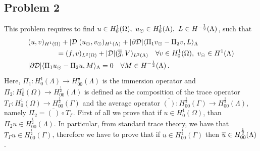 \subsection{Problem 2}
This problem requires to find $u \in H^1_0(\Omega),\ u_{\odot} \in H^1_0(\Lambda), \ L \in H^{-\frac12}(\Lambda)$, such that
\begin{subequations}\label{eq:red_dirneu}
\begin{align}
&(u,v)_{H^1(\Omega)} + |{\cal D}|(\ud,\vd)_{H^1(\Lambda)} 
+ |\partial {\cal D}| \langle  \Pi_1 \vd - \Pi_2 v, L \rangle_\Lambda 
\\
\nonumber
&\qquad\qquad= (f,v)_{L^2(\Omega)} + |{\cal D}| (\avrd{g},V)_{L^2(\Lambda)}
\quad \forall v \in H^1_0(\Omega), \ \vd \in H^1(\Lambda)
\\
&  |\partial {\cal D}| \langle \Pi_1 \ud - \Pi_2 u, M \rangle_\Lambda = 0
\quad \forall M \in H^{-\frac12}(\Lambda)\,.
\end{align}
\end{subequations}
Here, $\Pi_1: H^1_0(\Lambda)\rightarrow H^{\frac 12}_{00}(\Lambda)$ is the immersion operator and $\Pi_2: H^1_0(\Omega)\rightarrow H^{\frac 12}_{00}(\Lambda)$ is defined as the composition of the trace operator $T_{\Gamma}: H^1_0(\Omega) \rightarrow H^{\frac 12}_{00}(\Gamma)$ and the average operator $\bar{(\,)}:H^{\frac 12}_{00}(\Gamma) \rightarrow H^{\frac 12}_{00}(\Lambda)$, namely $\Pi_2= \bar{(\,)}\circ T_{\Gamma}$. 
First of all we prove that if $u\in H^1_0(\Omega)$, than $\Pi _2 u \in H^{\frac 12}_{00}(\Lambda)$. In particular, from standard trace theory, we have that $T_{\Gamma} u\in H^{\frac 12}_{00}(\Gamma)$, therefore we have to prove that if $u \in H^{\frac 12 }_{00}(\Gamma)$ then $\overline{u}\in H^{\frac 12}_{00}(\Lambda)$. 


